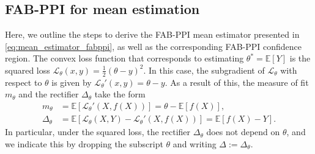 
\subsection{FAB-PPI for mean estimation}\label{app:fabppi_squared_loss}
Here, we outline the steps to derive the FAB-PPI mean estimator presented in \cref{eq:mean_estimator_fabppi}, as well as the corresponding FAB-PPI confidence region.
The convex loss function that corresponds to estimating $\theta^* = \mathbb{E}[Y]$ is the squared loss $\mathcal{L}_\theta(x, y) = \frac{1}{2}\left(\theta - y\right)^2$. In this case, the subgradient of $\mathcal{L}_\theta$ with respect to $\theta$ is given by $\mathcal{L}_\theta'(x, y) = \theta - y$. As a result of this, the measure of fit $m_\theta$ and the rectifier $\Delta_\theta$ take the form
\begin{align*}
    m_\theta &= \mathbb{E}[\mathcal{L}_\theta'(X, f(X))] = \theta - \mathbb{E}[f(X)], \\
    \Delta_\theta &= \mathbb{E}[\mathcal{L}_\theta(X, Y) - \mathcal{L}_\theta'(X, f(X))] = \mathbb{E}[f(X) - Y].
\end{align*}
In particular, under the squared loss, the rectifier $\Delta_\theta$ does not depend on $\theta$, and we indicate this by dropping the subscript $\theta$ and writing $\Delta := \Delta_\theta$.


